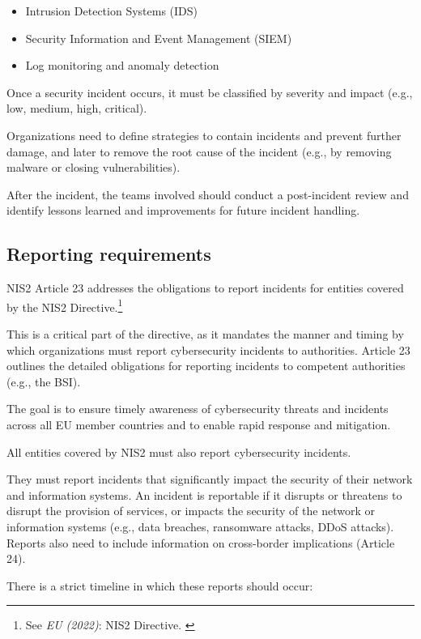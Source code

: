 \begin{itemize}
    \item Intrusion Detection Systems (IDS)
    \item Security Information and Event Management (SIEM)
    \item Log monitoring and anomaly detection
\end{itemize}

Once a security incident occurs, it must be classified by severity and impact (e.g., low, medium, high, critical).

Organizations need to define strategies to contain incidents and prevent further damage, and later to remove the root cause of the incident (e.g., by removing malware or closing vulnerabilities).

After the incident, the teams involved should conduct a post-incident review and identify lessons learned and improvements for future incident handling.

\subsection{Reporting requirements}\label{reporting-reqs}

NIS2 Article 23 addresses the obligations to report incidents for entities covered by the NIS2 Directive.\footnote{See \textit{EU (2022)}: NIS2 Directive. \cite{nis2}}

This is a critical part of the directive, as it mandates the manner and timing by which organizations must report cybersecurity incidents to authorities. Article 23 outlines the detailed obligations for reporting incidents to competent authorities (e.g., the BSI). 

The goal is to ensure timely awareness of cybersecurity threats and incidents across all EU member countries and to enable rapid response and mitigation.

All entities covered by NIS2 must also report cybersecurity incidents.

They must report incidents that significantly impact the security of their network and information systems. An incident is reportable if it disrupts or threatens to disrupt the provision of services, or impacts the security of the network or information systems (e.g., data breaches, ransomware attacks, DDoS attacks). Reports also need to include information on cross-border implications (Article 24).

There is a strict timeline in which these reports should occur:

